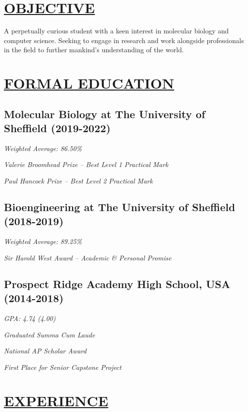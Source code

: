 \documentclass[twocolumn, a4paper, fontsize=9pt, headsepline, footsepline]{scrartcl}
\begin{document}
\onehalfspacing
{}
\setul{}{2pt}
\section*{\ul{OBJECTIVE}}
\noindent
A perpetually curious student with a keen interest in molecular biology and
computer science. Seeking to engage in research and work alongside professionals
in the field to further mankind's understanding of the world.

\section*{\ul{FORMAL EDUCATION}}
\subsection*{Molecular Biology at The University of Sheffield (2019-2022)}
\vspace{-5pt}
\emph{Weighted Average: 86.50\%}\par
\emph{Valerie Broomhead Prize – \emph{Best Level 1 Practical Mark}}\par
\emph{Paul Hancock Prize – \emph{Best Level 2 Practical Mark}}\par

\subsection*{Bioengineering at The University of Sheffield (2018-2019)}
\vspace{-5pt}
\emph{Weighted Average: 89.25\%}\par
\emph{Sir Harold West Award  – \emph{Academic \& Personal Promise}}

\subsection*{Prospect Ridge Academy High School, USA (2014-2018)}
\vspace{-5pt}
\emph{GPA: 4.74 (4.00)}\par
\emph{Graduated Summa Cum Laude}\par
\emph{National AP Scholar Award}\par
\emph{First Place for Senior Capstone Project}

\section*{\ul{EXPERIENCE}}
\end{document}
